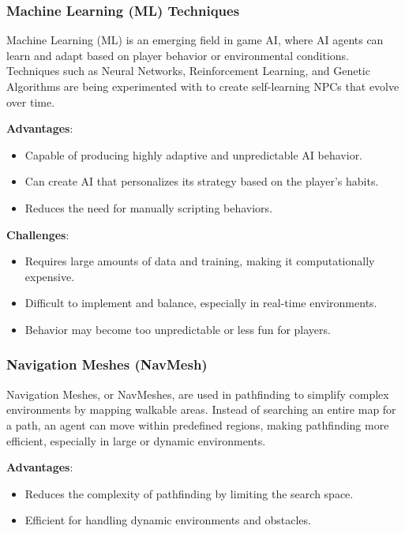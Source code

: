 \documentclass{article} %
\begin{document}
\subsubsection{Machine Learning (ML) Techniques}

Machine Learning (ML) is an emerging field in game AI, where AI agents can learn and adapt based on player behavior or environmental conditions. Techniques such as Neural Networks, Reinforcement Learning, and Genetic Algorithms are being experimented with to create self-learning NPCs that evolve over time.

\textbf{Advantages}:
\begin{itemize}
	\item Capable of producing highly adaptive and unpredictable AI behavior.
	\item Can create AI that personalizes its strategy based on the player's habits.
	\item Reduces the need for manually scripting behaviors.
\end{itemize}

\textbf{Challenges}:
\begin{itemize}
	\item Requires large amounts of data and training, making it computationally expensive.
	\item Difficult to implement and balance, especially in real-time environments.
	\item Behavior may become too unpredictable or less fun for players.
\end{itemize}

\subsubsection{Navigation Meshes (NavMesh)}

Navigation Meshes, or NavMeshes, are used in pathfinding to simplify complex environments by mapping walkable areas. Instead of searching an entire map for a path, an agent can move within predefined regions, making pathfinding more efficient, especially in large or dynamic environments.

\textbf{Advantages}:
\begin{itemize}
	\item Reduces the complexity of pathfinding by limiting the search space.
	\item Efficient for handling dynamic environments and obstacles.
\end{itemize}
\end{document}
